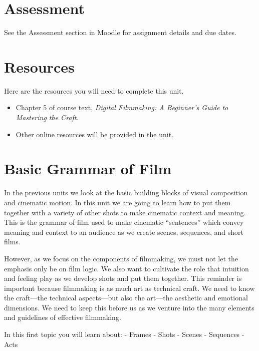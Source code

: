 \documentclass[
]{book}
\providecommand{\tightlist}{%
  \setlength{\itemsep}{0pt}\setlength{\parskip}{0pt}}
\begin{document}
\hypertarget{assessment-6}{%
\section*{Assessment}\label{assessment-6}}

See the Assessment section in Moodle for assignment details and due dates.

\hypertarget{resources-4}{%
\section*{Resources}\label{resources-4}}

Here are the resources you will need to complete this unit.

\begin{itemize}
\tightlist
\item
  Chapter 5 of course text, \emph{Digital Filmmaking: A Beginner's Guide to Mastering the Craft.}
\item
  Other online resources will be provided in the unit.
\end{itemize}

\hypertarget{basic-grammar-of-film}{%
\section{Basic Grammar of Film}\label{basic-grammar-of-film}}

In the previous units we look at the basic building blocks of visual composition and cinematic motion. In this unit we are going to learn how to put them together with a variety of other shots to make cinematic context and meaning. This is the grammar of film used to make cinematic ``sentences'' which convey meaning and context to an audience as we create scenes, sequences, and short films.

However, as we focus on the components of filmmaking, we must not let the emphasis only be on film logic. We also want to cultivate the role that intuition and feeling play as we develop shots and put them together. This reminder is important because filmmaking is as much art as technical craft. We need to know the craft---the technical aspects---but also the art---the aesthetic and emotional dimensions. We need to keep this before us as we venture into the many elements and guidelines of effective filmmaking.

In this first topic you will learn about:
- Frames
- Shots
- Scenes
- Sequences
- Acts
\end{document}
